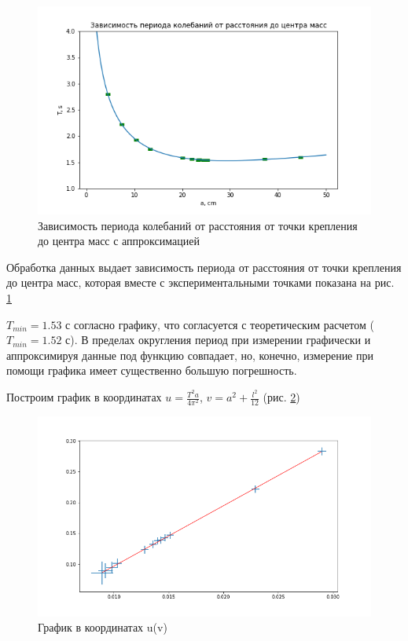 \documentclass[a4paper,12pt]{article} %
\begin{document}
\begin{figure}[h!]
\begin{center}
\includegraphics[width=\textwidth]{T(a)+fun}
\end{center}
\caption{Зависимость периода колебаний от расстояния от точки крепления до центра масс с аппроксимацией} \label{T(a)+fun}
\end{figure}

Обработка данных выдает зависимость периода от расстояния от точки крепления до центра масс, которая вместе с экспериментальными точками показана на рис. \ref{T(a)+fun}

$T_{min} = 1.53 $ с согласно графику, что согласуется с теоретическим расчетом ($T_{min} = 1.52$ с). В пределах округления период при измерении графически и аппроксимируя данные под функцию совпадает, но, конечно, измерение при помощи графика имеет существенно большую погрешность.

Построим график в координатах $u=\frac{T^2a}{4\pi^2}$, $v = a^2+\frac{l^2}{12}$ (рис. \ref{u(v)})
\begin{figure}[h!]
\begin{center}
\includegraphics[width=\textwidth]{u(v)}
\end{center}
\caption{График в координатах u(v)} \label{u(v)}
\end{figure}
\end{document}
